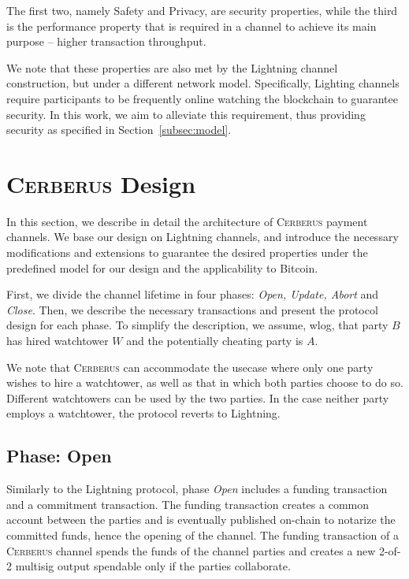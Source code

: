 \documentclass[runningheads]{llncs}
\newcommand{\authnote}[3]{{ \footnotesize \bf{#1[#2: #3]~}}} %
\newcommand{\edit}[1]{\authnote{\color{blue}}{edit}{#1}}
\newcommand{\sys}{\textsc{Cerberus}\xspace}
\begin{document}
The first two, namely Safety and Privacy, are security properties, while the third is the performance property that is required in a channel to achieve its main purpose -- higher transaction throughput.

We note that these properties are also met by the Lightning channel construction, but under a different network model. Specifically, Lighting channels require participants to be frequently online watching the blockchain to guarantee security. In this work, we aim to alleviate this requirement, thus providing security as specified in Section~\ref{subsec:model}.






\section{\sys Design}\label{sec:design}

In this section, we describe in detail the architecture of \sys payment channels. We base our design on Lightning channels, and introduce the necessary modifications and extensions to guarantee the desired properties under the predefined model for our design and the applicability to Bitcoin.

First, we divide the channel lifetime in four phases: \textit{Open, Update, Abort} and \textit{Close}. Then, we describe the necessary transactions  and present the protocol design for each phase.
To simplify the description, we assume, wlog, that party $B$ has hired watchtower $W$ and the potentially cheating party is $A$.

We note that \sys can accommodate the usecase where only one party wishes to hire a watchtower, as well as that in which both parties choose to do so. Different watchtowers can be used by the two parties. In the case neither party employs a watchtower, the protocol reverts to Lightning.


\subsection{Phase: Open}\label{subsec:open}
Similarly to the Lightning protocol, phase \textit{Open} includes a funding transaction and a commitment transaction.
The funding transaction creates a common account between the parties and is eventually published on-chain to notarize the committed funds, hence the opening of the channel. The funding transaction of a \sys channel spends the funds of the channel parties and creates a new 2-of-2 multisig output spendable only if the parties collaborate.
\end{document}
